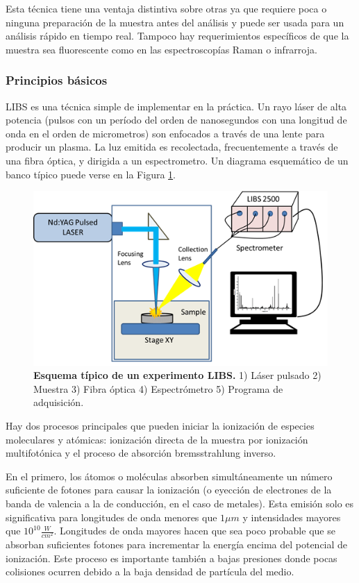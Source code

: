 \documentclass[12pt]{article}
\begin{document}
Esta técnica tiene una ventaja distintiva sobre otras ya que requiere poca o ninguna preparación de la muestra antes del análisis y puede ser usada para un análisis rápido en tiempo real. Tampoco hay requerimientos específicos de que la muestra sea fluorescente como en las espectroscopías Raman o infrarroja.

\subsubsection{Principios básicos}

LIBS es una técnica simple de implementar en la práctica. Un rayo láser de alta potencia (pulsos con un período del orden de nanosegundos con una longitud de onda en el orden de micrometros) son enfocados a través de una lente para producir un plasma. La luz emitida es recolectada, frecuentemente a través de una fibra óptica, y dirigida a un espectrometro\cite{LIBS}. Un diagrama esquemático de un banco típico puede verse en la Figura \ref{fig:LIBS1}.

\begin{figure}[htbp]
    \centering
    \includegraphics[width=15cm]{Esquema LIBS.png}
    \caption{\textbf{Esquema típico de un experimento LIBS.} 1) Láser pulsado 2) Muestra 3) Fibra óptica  4) Espectrómetro 5) Programa de adquisición.}
    \label{fig:LIBS1}
\end{figure}

Hay dos procesos principales que pueden iniciar la ionización de especies moleculares y atómicas\cite{LIBS}: ionización directa de la muestra por ionización multifotónica y el proceso de absorción bremsstrahlung inverso. 

En el primero, los átomos o moléculas absorben simultáneamente un número suficiente de fotones para causar la ionización (o eyección de electrones de la banda de valencia a la de conducción, en el caso de metales). Esta emisión solo es significativa para longitudes de onda menores que $1 \mu m$ y intensidades mayores que $10^{10}\frac{W}{{cm}^2}$. Longitudes de onda mayores hacen que sea poco probable que se absorban suficientes fotones para incrementar la energía encima del potencial de ionización. Este proceso es importante también a bajas presiones donde pocas colisiones ocurren debido a la baja densidad de partícula del medio.
\end{document}
